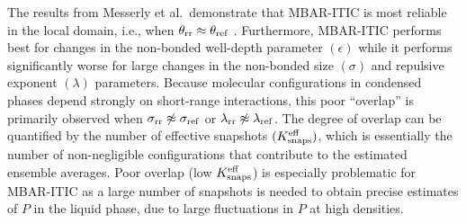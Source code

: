 \documentclass[journal=jced,manuscript=article]{achemso}
\begin{document}




The results from Messerly et al.~demonstrate that MBAR-ITIC is most reliable in the local domain, i.e., when $\theta_{\rm rr} \approx \theta_{\rm ref}$ \cite{Postdoc_1}. Furthermore, MBAR-ITIC performs best for changes in the non-bonded well-depth parameter $(\epsilon)$ while it performs significantly worse for large changes in the non-bonded size $(\sigma)$ and repulsive exponent $(\lambda)$ parameters. Because molecular configurations in condensed phases depend strongly on short-range interactions, this poor ``overlap'' is primarily observed when $\sigma_{\rm rr} \not\approx \sigma_{\rm ref}$ or $\lambda_{\rm rr} \not\approx \lambda_{\rm ref}$. The degree of overlap can be quantified by the number of effective snapshots $(K^{\rm eff}_{\rm snaps})$, which is essentially the number of non-negligible configurations that contribute to the estimated ensemble averages. Poor overlap (low $K^{\rm eff}_{\rm snaps}$) is especially problematic for MBAR-ITIC as a large number of snapshots is needed to obtain precise estimates of $P$ in the liquid phase, due to large fluctuations in $P$ at high densities.
\end{document}
